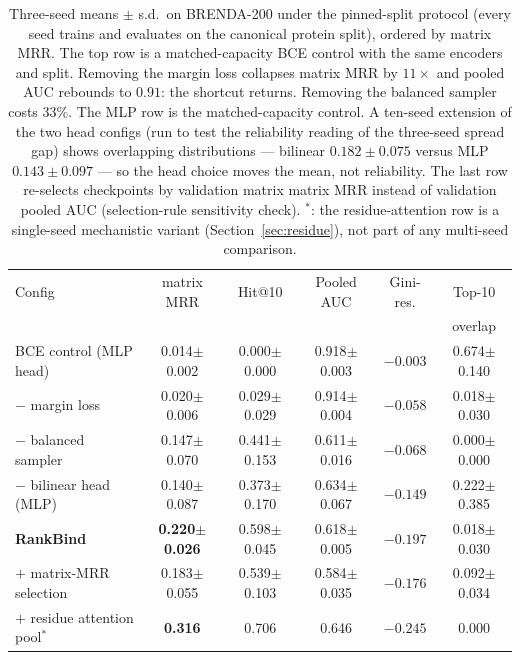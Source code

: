 \documentclass[11pt,a4paper]{article}
\newcommand{\method}{RankBind\xspace}
\newcommand{\mrr}{matrix MRR}
\begin{document}
\begin{table}[t]
\centering
\caption{Three-seed means $\pm$ s.d.\ on BRENDA-200 under the pinned-split
protocol (every seed trains and evaluates on the canonical protein split),
ordered by \mrr{}.
The top row is a matched-capacity BCE control with the same encoders and
split. Removing the margin loss collapses \mrr{} by $11\times$ and pooled
AUC rebounds to $0.91$: the shortcut returns. Removing the balanced sampler
costs $33\%$. The MLP row is the matched-capacity control. A ten-seed
extension of the two head configs (run to test the reliability reading of
the three-seed spread gap) shows overlapping distributions --- bilinear
$0.182\pm0.075$ versus MLP $0.143\pm0.097$ --- so the head choice moves the
mean, not reliability. The last row re-selects checkpoints by
validation matrix \mrr{} instead of validation pooled AUC (selection-rule
sensitivity check). $^*$: the residue-attention row is a single-seed
mechanistic variant (Section~\ref{sec:residue}), not part of any multi-seed
comparison.}
\label{tab:ablation}
\small
\setlength{\tabcolsep}{4pt}
\begin{tabular}{lccccc}
\toprule
Config & \mrr{} & Hit@10 & Pooled AUC & Gini-res. & Top-10 \\
       &        &        &            &           & overlap \\
\midrule
BCE control (MLP head)        & 0.014$\pm$0.002 & 0.000$\pm$0.000 & 0.918$\pm$0.003 & $-0.003$ & 0.674$\pm$0.140 \\
$-$ margin loss               & 0.020$\pm$0.006 & 0.029$\pm$0.029 & 0.914$\pm$0.004 & $-0.058$ & 0.018$\pm$0.030 \\
$-$ balanced sampler          & 0.147$\pm$0.070 & 0.441$\pm$0.153 & 0.611$\pm$0.016 & $-0.068$ & 0.000$\pm$0.000 \\
$-$ bilinear head (MLP)       & 0.140$\pm$0.087 & 0.373$\pm$0.170 & 0.634$\pm$0.067 & $-0.149$ & 0.222$\pm$0.385 \\
\textbf{\method}              & \textbf{0.220$\pm$0.026} & 0.598$\pm$0.045 & 0.618$\pm$0.005 & $-0.197$ & 0.018$\pm$0.030 \\
$+$ matrix-MRR selection      & 0.183$\pm$0.055 & 0.539$\pm$0.103 & 0.584$\pm$0.035 & $-0.176$ & 0.092$\pm$0.034 \\
$+$ residue attention pool$^*$ & \textbf{0.316} & 0.706 & 0.646 & $-0.245$ & 0.000 \\
\bottomrule
\end{tabular}
\end{table}
\end{document}
